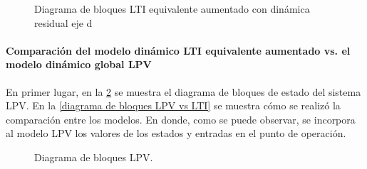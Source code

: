 \documentclass[a4paper, 10pt, onecolumn,journal]{ieeeconf}
\begin{document}
\begin{figure}[thpb]
	\centering
	\begin{adjustbox}{max width=\columnwidth}
	\end{adjustbox}
	\caption{Diagrama de bloques LTI equivalente aumentado con dinámica residual eje d}
	\label{diagrama de bloques modelo LTI eq}
\end{figure}

\paragraph{\textbf{Comparación del modelo dinámico LTI equivalente aumentado vs. el modelo dinámico global LPV}}
En primer lugar, en la \cref{diagrama de bloques LPV} se muestra el diagrama de bloques de estado del sistema LPV.
En la \cref{diagrama de bloques LPV vs LTI} se muestra cómo se realizó la comparación entre los modelos. En donde, como se puede observar,
se incorpora al modelo LPV los valores de los estados y entradas en el punto de operación.

\begin{figure}[thpb]
	\centering
	\begin{adjustbox}{max width=\columnwidth}
	\end{adjustbox}
	\caption{Diagrama de bloques LPV.}
	\label{diagrama de bloques LPV}
\end{figure}
\end{document}
